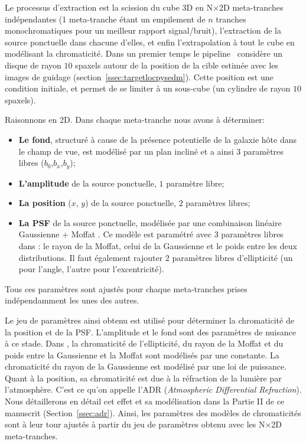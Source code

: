 \documentclass[../main/main.tex]{subfiles}
\begin{document}
Le processus d'extraction est la scission du cube 3D en N$\times$2D
meta-tranches indépendantes (1 meta-tranche étant un empilement de $n$
tranches monochromatiques pour un meilleur rapport signal/bruit), l'extraction de la source ponctuelle dans chacune
d'elles, et enfin l'extrapolation à tout le cube en modélisant la
chromaticité.
Dans un premier temps le pipeline \pysedm\ considère un disque de rayon $10$
spaxels autour de la position de la cible estimée avec les images de
guidage (section~\ref{ssec:targetlocpysedm}). Cette position est une
condition initiale, et permet de se limiter à un sous-cube (un cylindre
de rayon $10$ spaxels).

Raisonnons en 2D. Dans chaque meta-tranche nous avons à déterminer:
\begin{itemize}[label=$\bullet$]
\itemsep0em 
\item \textbf{Le fond}, structuré à cause de la
  présence potentielle de la galaxie hôte dans le champ de vue, est
  modélisé par un plan incliné et a ainsi $3$ paramètres libres ($b_{0}$,$b_{x}$,$b_{y}$);
\item \textbf{L'amplitude} de la source ponctuelle, $1$ paramètre libre;
\item \textbf{La position} ($x$, $y$) de la source ponctuelle, $2$ paramètres libres;
\item \textbf{La PSF} de la source ponctuelle, modélisée par une
  combinaison linéaire Gaussienne + Moffat \citep{Butonthese,Buton2013}. Ce modèle est paramétré avec $3$ paramètres libres
  dans \citet{pysedm}: le rayon de la Moffat, celui de la Gaussienne et
  le poids entre les deux distributions. Il faut également rajouter $2$ paramètres libres
  d'ellipticité (un pour l'angle, l'autre pour l'excentricité).
\end{itemize}

Tous ces paramètres sont ajustés pour chaque meta-tranches prises
indépendamment les unes des autres.

Le jeu de paramètres ainsi obtenu est utilisé pour déterminer la
chromaticité de la position et de la PSF. L'amplitude et
le fond sont des paramètres de nuisance à ce stade.
Dans \pysedm, la chromaticité de l'ellipticité, du rayon de la Moffat et du poids entre la
Gaussienne et la Moffat sont modélisés par une constante. La
chromaticité du rayon de la
Gaussienne est modélisé par une loi de puissance.
Quant à la position, sa chromaticité est due à la réfraction de la
lumière par l'atmosphère. C'est ce qu'on appelle l'ADR (\textit{Atmospheric
Differential Refraction}). Nous détaillerons en détail cet effet et sa
modélisation dans la
Partie II de ce manuscrit (Section~\ref{ssec:adr}).
Ainsi, les paramètres des modèles de chromaticités sont à leur tour
ajustés à partir du jeu de paramètres obtenu avec les N$\times$2D
meta-tranches.
\end{document}
